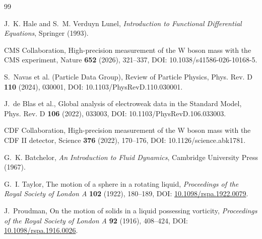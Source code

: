 \documentclass[11pt]{article}
\theoremstyle{definition}
\theoremstyle{plain}
\theoremstyle{remark}
\begin{document}
        \begin{thebibliography}{99}
            
            J.~K. Hale and S.~M. Verduyn Lunel,
            \newblock \emph{Introduction to Functional Differential Equations},
            \newblock Springer (1993).
            
            CMS Collaboration,
            \newblock High-precision measurement of the W boson mass with the CMS experiment,
            \newblock Nature \textbf{652} (2026), 321--337,
            \newblock DOI: 10.1038/s41586-026-10168-5.
            
            S.~Navas et al. (Particle Data Group),
            \newblock Review of Particle Physics,
            \newblock Phys. Rev. D \textbf{110} (2024), 030001,
            \newblock DOI: 10.1103/PhysRevD.110.030001.
            
            J.~de Blas et al.,
            \newblock Global analysis of electroweak data in the Standard Model,
            \newblock Phys. Rev. D \textbf{106} (2022), 033003,
            \newblock DOI: 10.1103/PhysRevD.106.033003.
            
            CDF Collaboration,
            \newblock High-precision measurement of the W boson mass with the CDF II detector,
            \newblock Science \textbf{376} (2022), 170--176,
            \newblock DOI: 10.1126/science.abk1781.
            
            G.~K. Batchelor,
            \newblock \emph{An Introduction to Fluid Dynamics},
            \newblock Cambridge University Press (1967).

            G.~I. Taylor,
            \newblock The motion of a sphere in a rotating liquid,
            \newblock \emph{Proceedings of the Royal Society of London A} \textbf{102} (1922), 180--189,
            \newblock DOI: \href{https://doi.org/10.1098/rspa.1922.0079}{10.1098/rspa.1922.0079}.

            J.~Proudman,
            \newblock On the motion of solids in a liquid possessing vorticity,
            \newblock \emph{Proceedings of the Royal Society of London A} \textbf{92} (1916), 408--424,
            \newblock DOI: \href{https://doi.org/10.1098/rspa.1916.0026}{10.1098/rspa.1916.0026}.


\end{thebibliography}
\end{document}
